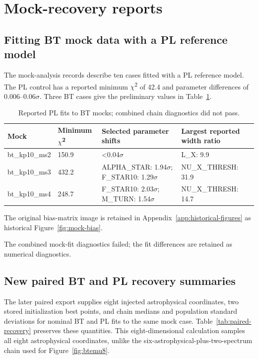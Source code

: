 \section{Mock-recovery reports}\label{app:mock-recovery}

\subsection{Fitting BT mock data with a PL reference model}\label{fitting-bt-mock-data-with-a-pl-reference-model}

The mock-analysis records describe ten cases fitted with a PL reference model. The PL control has a reported minimum \(\chi\)\textsuperscript{2} of 42.4 and parameter differences of 0.006--0.06\(\sigma\). Three BT cases give the preliminary values in Table~\ref{tab:mock-summary}.

\begin{table}[t]
\caption{Reported PL fits to BT mocks; combined chain diagnostics did not pass.}
\label{tab:mock-summary}
\centering\small
\begin{tabular}{p{}p{}p{}p{}}
\toprule
Mock & Minimum \(\chi\)\textsuperscript{2} & Selected parameter shifts & Largest reported width ratio \\
\midrule
bt\_kp10\_ms2 & 150.9 & \textless0.04\(\sigma\) & L\_X: 9.9 \\
bt\_kp10\_ms3 & 432.2 & ALPHA\_STAR: 1.94\(\sigma\); F\_STAR10: 1.29\(\sigma\) & NU\_X\_THRESH: 31.9 \\
bt\_kp10\_ms4 & 248.7 & F\_STAR10: 2.03\(\sigma\); M\_TURN: 1.54\(\sigma\) & NU\_X\_THRESH: 14.7 \\
\bottomrule
\end{tabular}
\end{table}

The original bias-matrix image is retained in Appendix~\ref{app:historical-figures} as historical Figure~\ref{fig:mock-bias}.

The combined mock-fit diagnostics failed; the fit differences are retained as numerical diagnostics.

\subsection{New paired BT and PL recovery summaries}\label{paired-recovery-update}

The later paired export supplies eight injected astrophysical coordinates, two stored initialization best points, and chain medians and population standard deviations for nominal BT and PL fits to the same mock case. Table~\ref{tab:paired-recovery} preserves these quantities. This eight-dimensional calculation samples all eight astrophysical coordinates, unlike the six-astrophysical-plus-two-spectrum chain used for Figure~\ref{fig:btemu8}.

